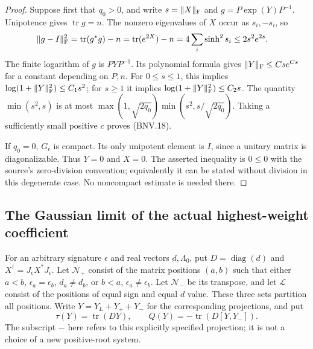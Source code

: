 \begin{proof}
Suppose first that $q_0>0$, and write $s=\|X\|_{\rm F}$ and
$g=P\exp(Y)P^{-1}$.  Unipotence gives $\operatorname{tr}g=n$.
The nonzero eigenvalues of $X$ occur as $s_i,-s_i$, so
\[
 \begin{split}
 \|g-I\|_{\rm F}^2
 &=\operatorname{tr}(g^*g)-n
   =\operatorname{tr}(e^{2X})-n
   =4\sum_i\sinh^2s_i
 \le2s^2e^{2s}.
 \end{split}
\]
The finite logarithm of $g$ is $PYP^{-1}$.  Its polynomial formula gives
$\|Y\|_{\rm F}\le C s e^{Cs}$ for a constant depending on $P,n$.
For $0\le s\le1$, this implies
$\log(1+\|Y\|_{\rm F}^2)\le C_1s^2$; for $s\ge1$ it implies
$\log(1+\|Y\|_{\rm F}^2)\le C_2s$.
The quantity $\min(s^2,s)$ is at most
$\max(1,\sqrt{2q_0})\min(s^2,s/\sqrt{2q_0})$.
Taking a sufficiently small positive $c$ proves (BNV.18).

If $q_0=0$, $G_\epsilon$ is compact.  Its only unipotent element is $I$,
since a unitary matrix is diagonalizable.  Thus $Y=0$ and $X=0$.
The asserted inequality is $0\le0$ with the source's zero-division
convention; equivalently it can be stated without division in this
degenerate case.  No noncompact estimate is needed there.
\end{proof}

\subsection{The Gaussian limit of the actual highest-weight coefficient}

For an arbitrary signature $\epsilon$ and real vectors $d,\Lambda_0$, put
$D=\operatorname{diag}(d)$ and $X^\dagger=J_\epsilon X^*J_\epsilon$.
Let $\mathcal N_+$ consist of the matrix positions $(a,b)$ such that either
$a<b$, $\epsilon_a=\epsilon_b$, $d_a\ne d_b$, or
$b<a$, $\epsilon_a\ne\epsilon_b$.
Let $\mathcal N_-$ be its transpose, and let $\mathcal L$ consist of the
positions of equal sign and equal $d$ value.  These three sets partition
all positions.  Write $Y=Y_L+Y_++Y_-$ for the corresponding projections,
and put
\[
 \tau(Y)=\operatorname{tr}(DY),\qquad
 Q(Y)=-\operatorname{tr}(D[Y,Y_-]).
 \tag{BNV.19}
\]
The subscript $-$ here refers to this explicitly specified projection;
it is not a choice of a new positive-root system.

